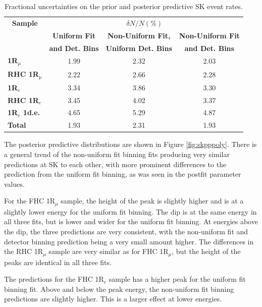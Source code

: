 \begin{center}
\begin{table}
\center
\begin{tabular}{l||c c c}
\hline \hline
\multicolumn{1}{c||}{\textbf{Sample}} & \multicolumn{3}{c}{$\delta N/N (\%)$}\\
& \multicolumn{1}{c}{\textbf{Uniform Fit}} & \multicolumn{1}{c}{\textbf{Non-Uniform Fit,}} & \multicolumn{1}{c}{\textbf{Non-Uniform Fit}}\\
& \multicolumn{1}{c}{\textbf{and Det. Bins}} & \multicolumn{1}{c}{\textbf{Uniform Det. Bins}} & \multicolumn{1}{c}{\textbf{and Det. Bins}}\\
\hline\hline
\textbf{1R$_{\mu}$} & 1.99 & 2.32 & 2.03\\
\textbf{RHC 1R$_{\mu}$} & 2.22 & 2.66 & 2.28 \\ 
\textbf{1R$_{e}$} & 3.34 & 3.86 & 3.30\\
\textbf{RHC 1R$_{e}$} & 3.45 & 4.02 & 3.37\\
\textbf{1R$_{e}$ 1d.e.} & 4.65 & 5.29 & 4.87\\ \hline
\textbf{Total} & 1.93 & 2.31 & 1.93\\ \hline\hline
\end{tabular}
\caption{Fractional uncertainties on the prior and posterior predictive SK event rates.}
\label{tab:SKerr}
\end{table}
\end{center}

The posterior predictive distributions are shown in Figure \ref{fig:skpppoly}. There is a general trend of the non-uniform fit binning fits producing very similar predictions at SK to each other, with more prominent differences to the prediction from the uniform fit binning, as was seen in the postfit parameter values.

For the FHC 1R$_{\mu}$ sample, the height of the peak is slightly higher and is at a slightly lower energy for the uniform fit binning. The dip is at the same energy in all three fits, but is lower and wider for the uniform fit binning. At energies above the dip, the three predictions are very consistent, with the non-uniform fit and detector binning prediction being a very small amount higher. The differences in the RHC 1R$_{\mu}$ sample are very similar as for FHC 1R$_{\mu}$, but the height of the peaks are identical in all three fits.

The predictions for the FHC 1R$_e$ sample has a higher peak for the uniform fit binning fit. Above and below the peak energy, the non-uniform fit binning predictions are slightly higher. This is a larger effect at lower energies.

